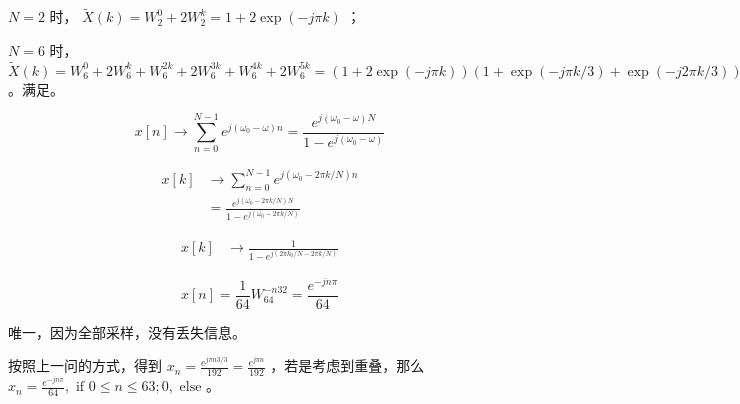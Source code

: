 \documentclass[lang=cn,11pt,a4paper,cite=authoryear]{elegantpaper}
\begin{document}
 
\(N=2\) 时， \(\tilde{X}(k) = W_2^0 + 2W_2^k = 1 + 2 \exp (-j \pi k)\) ；

\(N=6\) 时， \(\tilde{X}(k) = W_6^0 + 2W_6^k + W_6^{2k} + 2W_6^{3k} + W_6^{4 k} + 2 W_6^{5k}= (1 + 2 \exp (-j \pi k) )(1 + \exp(-j\pi k /3) + \exp(-j 2 \pi k / 3))\) 。满足。




\[x[n] \rightarrow \sum_{n=0}^{N-1} e^{j(\omega_0 - \omega) n} = \frac{e^{j(\omega_0 - \omega)N}}{1 - e^{j(\omega_0 - \omega)}}\]  


\[\begin{aligned}
    x[k] &\rightarrow \sum_{n=0}^{N-1} e^{j(\omega_0 - 2 \pi k / N) n}\\
    &= \frac{e^{j(\omega_0 - 2\pi k / N)N}}{1 - e^{j(\omega_0 - 2\pi k / N)}} 
\end{aligned}\]  


\[\begin{aligned}
    x[k] &\rightarrow  \frac{1}{1 - e^{j(2\pi k_0 / N - 2\pi k / N)}} 
\end{aligned}\]



\[x[n] = \frac{1}{64} W_{64}^{-n 32} = \frac{e^{-j n\pi}}{64}\]

唯一，因为全部采样，没有丢失信息。


按照上一问的方式，得到 \(x_n = \frac{e^{j \pi n 3 / 3}}{192} = \frac{e^{j\pi n}}{192}\) ，若是考虑到重叠，那么 \(x_n =  \frac{e^{-j n\pi}}{64} , \text{ if } 0 \leq n \leq 63; 0, \text{ else} \)  。


\end{document}
